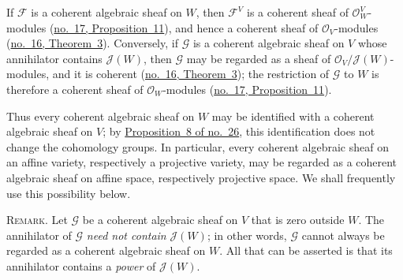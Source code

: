 If $\mathcal{F}$ is a coherent algebraic sheaf on $W$, then $\mathcal{F}^V$ is a coherent sheaf of $\mathcal{O}_W^V$-modules (\hyperref[fac:I:2:no:17:prop:11]{no.~17, Proposition~11}), and hence a coherent sheaf of $\mathcal{O}_V$-modules (\hyperref[fac:I:2:no:16:thm:3]{no.~16, Theorem~3}). Conversely, if $\mathcal{G}$ is a coherent algebraic sheaf on $V$ whose annihilator contains $\mathcal{J}(W)$, then $\mathcal{G}$ may be regarded as a sheaf of $\mathcal{O}_V/\mathcal{J}(W)$-modules, and it is coherent (\hyperref[fac:I:2:no:16:thm:3]{no.~16, Theorem~3}); the restriction of $\mathcal{G}$ to $W$ is therefore a coherent sheaf of $\mathcal{O}_W$-modules (\hyperref[fac:I:2:no:17:prop:11]{no.~17, Proposition~11}).

Thus every coherent algebraic sheaf on $W$ may be identified with a coherent algebraic sheaf on $V$; by \hyperref[fac:I:3:no:26:prop:8]{Proposition~8 of no.~26}, this identification does not change the cohomology groups. In particular, every coherent algebraic sheaf on an affine variety, respectively a projective variety, may be regarded as a coherent algebraic sheaf on affine space, respectively projective space. We shall frequently use this possibility below.

\label{fac:II:2:no:39:remark}
\textsc{Remark.} Let $\mathcal{G}$ be a coherent algebraic sheaf on $V$ that is zero outside $W$. The annihilator of $\mathcal{G}$ \textit{need not contain} $\mathcal{J}(W)$; in other words, $\mathcal{G}$ cannot always be regarded as a coherent algebraic sheaf on $W$. All that can be asserted is that its annihilator contains a \textit{power} of $\mathcal{J}(W)$.
